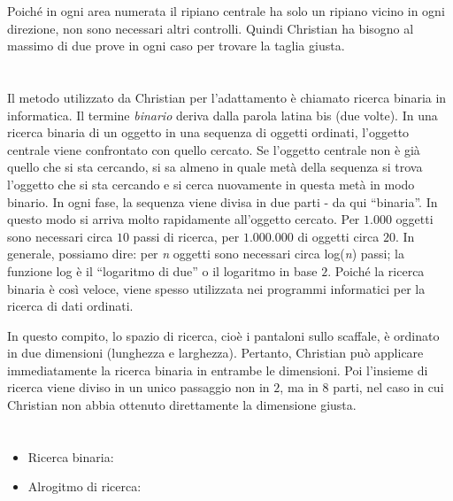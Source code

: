 {{Poiché in ogni area numerata il ripiano centrale ha solo un ripiano vicino in ogni direzione, non sono necessari altri controlli. Quindi Christian ha bisogno al massimo di due prove in ogni caso per trovare la taglia giusta.



\section*{\BrochureItsInformatics}
Il metodo utilizzato da Christian per l’adattamento è chiamato ricerca binaria in informatica. Il termine \emph{binario} deriva dalla parola latina bis (due volte). In una ricerca binaria di un oggetto in una sequenza di oggetti ordinati, l’oggetto centrale viene confrontato con quello cercato. Se l’oggetto centrale non è già quello che si sta cercando, si sa almeno in quale metà della sequenza si trova l’oggetto che si sta cercando e si cerca nuovamente in questa metà in modo binario. In ogni fase, la sequenza viene divisa in due parti - da qui \enquote{binaria}. In questo modo si arriva molto rapidamente all’oggetto cercato. Per $1.000$ oggetti sono necessari circa $10$ passi di ricerca, per $1.000$.$000$ di oggetti circa $20$. In generale, possiamo dire: per \emph{n} oggetti sono necessari circa log(\emph{n}) passi; la funzione log è il \enquote{logaritmo di due} o il logaritmo in base $2$. Poiché la ricerca binaria è così veloce, viene spesso utilizzata nei programmi informatici per la ricerca di dati ordinati.

In questo compito, lo spazio di ricerca, cioè i pantaloni sullo scaffale, è ordinato in due dimensioni (lunghezza e larghezza). Pertanto, Christian può applicare immediatamente la ricerca binaria in entrambe le dimensioni. Poi l’insieme di ricerca viene diviso in un unico passaggio non in $2$, ma in $8$ parti, nel caso in cui Christian non abbia ottenuto direttamente la dimensione giusta.



\section*{\BrochureWebsitesAndKeywords}
{\raggedright
\begin{itemize}
  \item Ricerca binaria: \href{https://it.wikipedia.org/wiki/Ricerca_dicotomica}{}
  \item Alrogitmo di ricerca: \href{https://it.wikipedia.org/wiki/Algoritmo_di_ricerca}{}
\end{itemize}


}}}
